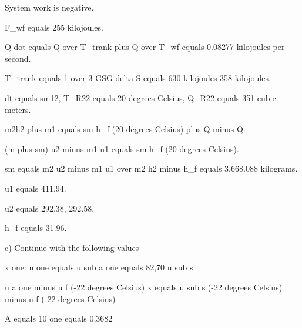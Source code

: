 System work is negative.

F_wf equals 255 kilojoules.

Q dot equals Q over T_trank plus Q over T_wf equals 0.08277 kilojoules per second.

T_trank equals 1 over 3 GSG delta S equals 630 kilojoules 358 kilojoules.

dt equals sm12, T_R22 equals 20 degrees Celsius, Q_R22 equals 351 cubic meters.

m2h2 plus m1 equals sm h_f (20 degrees Celsius) plus Q minus Q.

(m plus sm) u2 minus m1 u1 equals sm h_f (20 degrees Celsius).

sm equals m2 u2 minus m1 u1 over m2 h2 minus h_f equals 3,668.088 kilograms.

u1 equals 411.94.

u2 equals 292.38, 292.58.

h_f equals 31.96.

c) Continue with the following values

x one:
u one equals u sub a one equals 82,70 u sub s

u a one minus u f (-22 degrees Celsius)
x equals u sub s (-22 degrees Celsius) minus u f (-22 degrees Celsius)

A equals 10
one
equals 0,3682